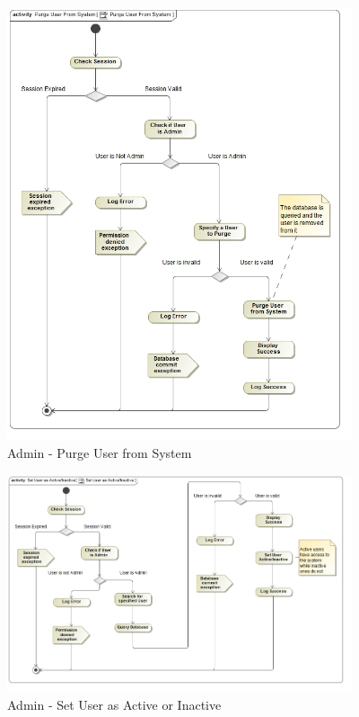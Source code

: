 \documentclass{article}
\begin{document}
			\begin{figure}[H]
				\includegraphics[width=4in, center]{../Diagrams/Process Specifications/User subsystem/Purge User From System.jpg}
				\caption{Admin - Purge User from System}
			\end{figure}
			\begin{figure}[H]
				\includegraphics[width=4in, center]{../Diagrams/Process Specifications/User subsystem/Set User as Active_Inactive.jpg}
				\caption{Admin - Set User as Active or Inactive}
			\end{figure}
\end{document}
